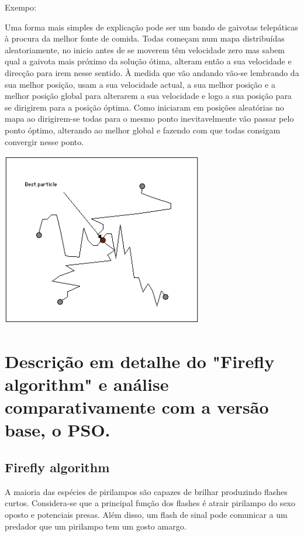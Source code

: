 \documentclass[10pt]{article}
\begin{document}
Exempo:

Uma forma mais simples de explicação pode ser um bando de gaivotas telepáticas à procura da melhor fonte de comida. Todas começam num mapa distribuídas aleatoriamente, no inicio antes de se moverem têm velocidade
zero mas sabem qual a gaivota mais próximo da solução ótima, alteram então a sua velocidade e direcção para
irem nesse sentido. À medida que vão andando vão-se lembrando da sua melhor posição, usam a sua velocidade actual, a sua melhor posição e a melhor posição global para alterarem a sua velocidade e logo a sua
posição para se dirigirem para a posição óptima. Como iniciaram em posições aleatórias no mapa ao dirigirem-se todas para o mesmo ponto inevitavelmente vão passar pelo ponto óptimo, alterando ao
melhor global e fazendo com que todas consigam convergir nesse ponto.

\begin{center}
  \includegraphics{img/PSO.png}
\end{center}


\newpage
\section{Descrição em detalhe do "Firefly algorithm" e análise comparativamente com a versão base, o PSO.}\label{sec:desc-algo}
\subsection{Firefly algorithm}

A maioria das espécies de pirilampos são capazes de brilhar produzindo flashes curtos. Considera-se que a principal função 
dos flashes é atrair pirilampo do sexo oposto e potenciais presas. Além disso, um flash de sinal pode comunicar a um 
predador que um pirilampo tem um gosto amargo.
\end{document}
